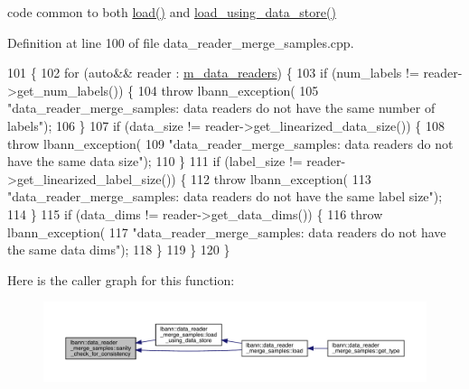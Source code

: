 code common to both \hyperlink{classlbann_1_1data__reader__merge__samples_ab3554341417f5eba95b9c1098af40410}{load()} and \hyperlink{classlbann_1_1data__reader__merge__samples_ad45275b73fcbca47b74a9c9767f69bc9}{load\+\_\+using\+\_\+data\+\_\+store()} 



Definition at line 100 of file data\+\_\+reader\+\_\+merge\+\_\+samples.\+cpp.


\begin{DoxyCode}
101                                                                                   \{
102   \textcolor{keywordflow}{for} (\textcolor{keyword}{auto}&& reader : \hyperlink{classlbann_1_1generic__compound__data__reader_a9815e94ade5873415fd766e09d956d5b}{m\_data\_readers}) \{
103     \textcolor{keywordflow}{if} (num\_labels != reader->get\_num\_labels()) \{
104       \textcolor{keywordflow}{throw} lbann\_exception(
105         \textcolor{stringliteral}{"data\_reader\_merge\_samples: data readers do not have the same number of labels"});
106     \}
107     \textcolor{keywordflow}{if} (data\_size != reader->get\_linearized\_data\_size()) \{
108       \textcolor{keywordflow}{throw} lbann\_exception(
109         \textcolor{stringliteral}{"data\_reader\_merge\_samples: data readers do not have the same data size"});
110     \}
111     \textcolor{keywordflow}{if} (label\_size != reader->get\_linearized\_label\_size()) \{
112       \textcolor{keywordflow}{throw} lbann\_exception(
113         \textcolor{stringliteral}{"data\_reader\_merge\_samples: data readers do not have the same label size"});
114     \}
115     \textcolor{keywordflow}{if} (data\_dims != reader->get\_data\_dims()) \{
116       \textcolor{keywordflow}{throw} lbann\_exception(
117         \textcolor{stringliteral}{"data\_reader\_merge\_samples: data readers do not have the same data dims"});
118     \}
119   \}
120 \}
\end{DoxyCode}
Here is the caller graph for this function\+:\nopagebreak
\begin{figure}[H]
\begin{center}
\leavevmode
\includegraphics[width=350pt]{classlbann_1_1data__reader__merge__samples_a240368aa9f7f2ab1fa7c8d534b7f54ed_icgraph}
\end{center}
\end{figure}
\mbox{\label{classlbann_1_1data__reader__merge__samples_a589d6997ad093721e8c2c2cb3197c9e2}} 
